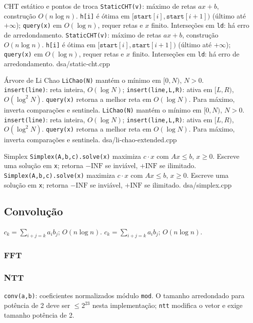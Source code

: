 \templateentry
{CHT estático e pontos de troca}
{\texttt{StaticCHT(v)}: máximo de retas $ax+b$, construção $O(n\log n)$. \texttt{h[i]} é ótima em $[\mathtt{start}[i],\mathtt{start}[i+1])$ (último até $+\infty$); \texttt{query(x)} em $O(\log n)$, requer retas e $x$ finito. Interseções em \texttt{ld}: há erro de arredondamento.}
{\texttt{StaticCHT(v)}: máximo de retas $ax+b$, construção $O(n\log n)$. \texttt{h[i]} é ótima em $[\mathtt{start}[i],\mathtt{start}[i+1])$ (último até $+\infty$); \texttt{query(x)} em $O(\log n)$, requer retas e $x$ finito. Interseções em \texttt{ld}: há erro de arredondamento.}
{dsa/static-cht.cpp}

\fi

\templateentry
{Árvore de Li Chao}
{\texttt{LiChao(N)} mantém o mínimo em $[0,N)$, $N>0$. \texttt{insert(line)}: reta inteira, $O(\log N)$; \texttt{insert(line,L,R)}: ativa em $[L,R)$, $O(\log^2N)$. \texttt{query(x)} retorna a melhor reta em $O(\log N)$. Para máximo, inverta comparações e sentinela.}
{\texttt{LiChao(N)} mantém o mínimo em $[0,N)$, $N>0$. \texttt{insert(line)}: reta inteira, $O(\log N)$; \texttt{insert(line,L,R)}: ativa em $[L,R)$, $O(\log^2N)$. \texttt{query(x)} retorna a melhor reta em $O(\log N)$. Para máximo, inverta comparações e sentinela.}
{dsa/li-chao-extended.cpp}

\templateentry
{Simplex}
{\texttt{Simplex(A,b,c).solve(x)} maximiza $c\cdot x$ com $Ax\le b$, \textbf{$x\ge0$}. Escreve uma solução em \texttt{x}; retorna $-\mathrm{INF}$ se inviável, $+\mathrm{INF}$ se ilimitado.}
{\texttt{Simplex(A,b,c).solve(x)} maximiza $c\cdot x$ com $Ax\le b$, \textbf{$x\ge0$}. Escreve uma solução em \texttt{x}; retorna $-\mathrm{INF}$ se inviável, $+\mathrm{INF}$ se ilimitado.}
{dsa/simplex.cpp}

\subsection{Convolução}
\varianttext
{$c_k = \sum_{i+j=k} a_i b_j$; $O(n\log n)$.}
{$c_k = \sum_{i+j=k} a_i b_j$; $O(n\log n)$.}
\subsubsection{FFT}
\subsubsection{NTT}
\texttt{conv(a,b)}: coeficientes normalizados módulo \texttt{mod}. O tamanho arredondado para potência de 2 deve ser $\le2^{23}$ nesta implementação; \texttt{ntt} modifica o vetor e exige tamanho potência de 2.

